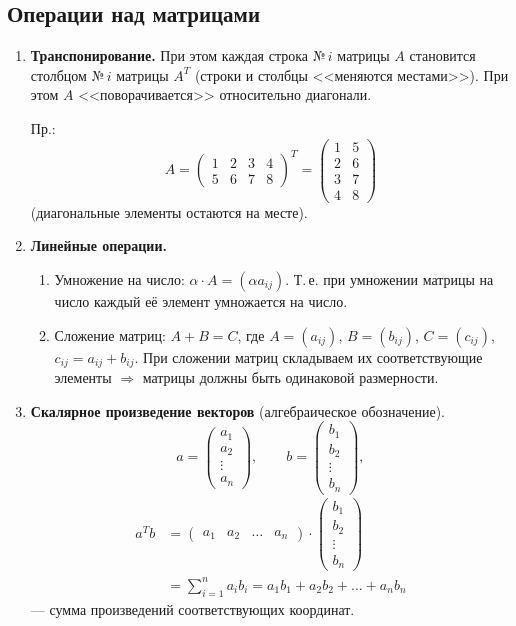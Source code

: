 \documentclass[a4paper, 12pt]{article}
\begin{document}
\subsection{Операции над матрицами}

\begin{enumerate}[label=\arabic*)]
  \item \textbf{Транспонирование.} При этом каждая строка №\,$i$ матрицы $A$
    становится столбцом №\,$i$ матрицы $A^T$ (строки и столбцы <<меняются
    местами>>). При этом $A$ <<поворачивается>> относительно диагонали.

    Пр.:
    \[
      A = \begin{pmatrix} 1 & 2 & 3 & 4 \\ 5 & 6 & 7 & 8 \end{pmatrix}^T
        = \begin{pmatrix} 1 & 5 \\ 2 & 6 \\ 3 & 7 \\ 4 & 8 \end{pmatrix}
    \]
    (диагональные элементы остаются на месте).

  \item \textbf{Линейные операции.}
    \begin{enumerate}[label=\alph*)]
      \item Умножение на число: $\alpha \cdot A = (\alpha a_{ij})$. Т.\,е.
        при умножении матрицы на число каждый её элемент умножается на число.
      \item Сложение матриц: $A + B = C$, где $A = (a_{ij})$, $B = (b_{ij})$,
        $C = (c_{ij})$, $c_{ij} = a_{ij} + b_{ij}$. При сложении матриц
        складываем их соответствующие элементы $\Rightarrow$ матрицы должны
        быть одинаковой размерности.
    \end{enumerate}

  \item \textbf{Скалярное произведение векторов} (алгебраическое обозначение).
    \[
      a = \begin{pmatrix} a_1 \\ a_2 \\ \vdots \\ a_n \end{pmatrix}, \qquad
      b = \begin{pmatrix} b_1 \\ b_2 \\ \vdots \\ b_n \end{pmatrix},
    \]
    \begin{align*}
      a^T b &= \begin{pmatrix} a_1 & a_2 & \dots & a_n \end{pmatrix} \cdot
        \begin{pmatrix} b_1 \\ b_2 \\ \vdots \\ b_n \end{pmatrix} \\
      &= \sum_{i=1}^{n} a_i b_i = a_1 b_1 + a_2 b_2 + \dots + a_n b_n
    \end{align*}
    --- сумма произведений соответствующих координат.


\end{enumerate}
\end{document}

